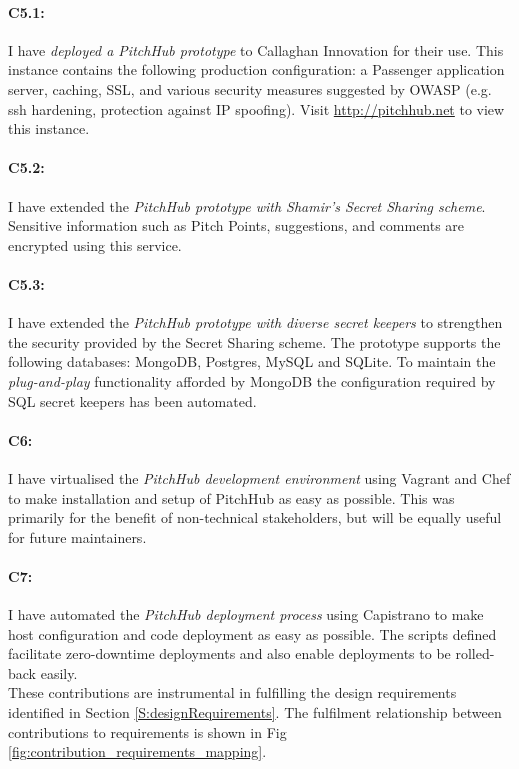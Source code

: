 \paragraph{C5.1:} I have {\em deployed a PitchHub prototype} to Callaghan Innovation for their use. This instance contains the following production configuration: a Passenger application server, caching, SSL, and various security measures suggested by OWASP (e.g. ssh hardening, protection against IP spoofing). Visit \url{http://pitchhub.net} to view this instance.


\paragraph{C5.2:} I have extended the {\em PitchHub prototype with Shamir's Secret Sharing scheme}. Sensitive information such as Pitch Points, suggestions, and comments are encrypted using this service.

\paragraph{C5.3:} I have extended the {\em PitchHub prototype with diverse secret keepers} to strengthen the security provided by the Secret Sharing scheme. The prototype supports the following databases: MongoDB, Postgres, MySQL and SQLite. To maintain the \textit{plug-and-play} functionality afforded by MongoDB the configuration required by SQL secret keepers has been automated.

\paragraph{C6:} I have virtualised the {\em PitchHub development environment} using Vagrant and Chef to make installation and setup of PitchHub as easy as possible. This was primarily for the benefit of non-technical stakeholders, but will be equally useful for future maintainers.

\paragraph{C7:} I have automated the {\em PitchHub deployment process} using Capistrano to make host configuration and code deployment as easy as possible. The scripts defined facilitate zero-downtime deployments and also enable deployments to be rolled-back easily.
\\
\newline
These contributions are instrumental in fulfilling the design requirements identified in Section \ref{S:designRequirements}. The fulfilment relationship between contributions to requirements is shown in Fig \ref{fig:contribution_requirements_mapping}.

